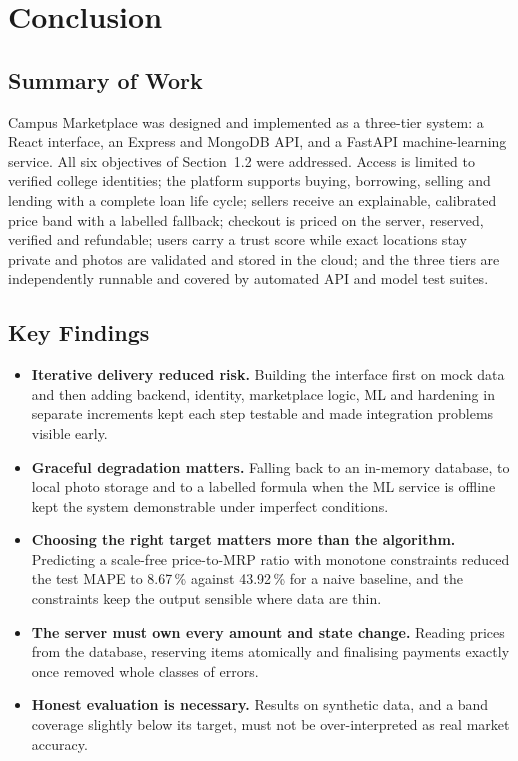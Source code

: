 \documentclass[11pt,letterpaper,oneside]{report}
\begin{document}
\chapter{Conclusion}\label{ch:conclusion}

\section{Summary of Work}
Campus Marketplace was designed and implemented as a three-tier system: a React interface,
an Express and MongoDB API, and a FastAPI machine-learning service. All six objectives of
Section~1.2 were addressed. Access is limited to verified college identities; the platform supports
buying, borrowing, selling and lending with a complete loan life cycle; sellers receive an explainable,
calibrated price band with a labelled fallback; checkout is priced on the server, reserved, verified
and refundable; users carry a trust score while exact locations stay private and photos are validated
and stored in the cloud; and the three tiers are independently runnable and covered by automated API
and model test suites.

\section{Key Findings}
\begin{itemize}
  \item \textbf{Iterative delivery reduced risk.} Building the interface first on mock data and then adding
        backend, identity, marketplace logic, ML and hardening in separate increments kept each step
        testable and made integration problems visible early.
  \item \textbf{Graceful degradation matters.} Falling back to an in-memory database, to local photo storage
        and to a labelled formula when the ML service is offline kept the system demonstrable under
        imperfect conditions.
  \item \textbf{Choosing the right target matters more than the algorithm.} Predicting a scale-free
        price-to-MRP ratio with monotone constraints reduced the test MAPE to 8.67\,\% against 43.92\,\% for
        a naive baseline, and the constraints keep the output sensible where data are thin.
  \item \textbf{The server must own every amount and state change.} Reading prices from the database,
        reserving items atomically and finalising payments exactly once removed whole classes of errors.
  \item \textbf{Honest evaluation is necessary.} Results on synthetic data, and a band coverage slightly below
        its target, must not be over-interpreted as real market accuracy.
\end{itemize}
\end{document}

